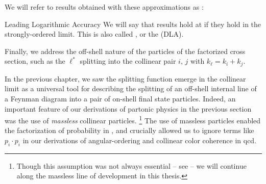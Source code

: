 We will refer to results obtained with these approximations as :

\begin{definitionbox}{Leading Logarithmic Accuracy}{}
    We will say that results hold at  if they hold in the strongly-ordered limit.
    This is also called , or the  (DLA).
\end{definitionbox}





Finally, we address the off-shell nature of the particles of the factorized cross section, such as the \(\ell^*\) splitting into the collinear pair \(i,\,j\) with \(k_\ell = k_i + k_j\).

In the previous chapter, we saw the splitting function emerge in the collinear limit as a universal tool for describing the splitting of an off-shell internal line of a Feynman diagram into a pair of on-shell final state particles.
%
Indeed, an important feature of our derivations of partonic physics in the previous section was the use of \textit{massless} collinear particles.%
\footnote{Though this assumption was not always essential -- see  -- we will continue along the massless line of development in this thesis.}
%
The use of massless particles enabled the factorization of probability in , and crucially allowed us to ignore terms like \(p_i\cdot p_i\) in our derivations of angular-ordering and collinear color coherence in \gls{qcd}.

